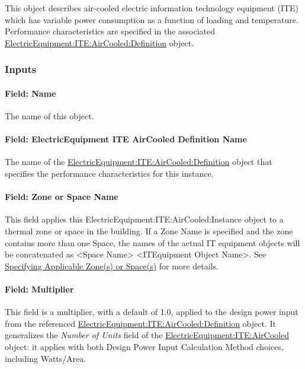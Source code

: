 This object describes air-cooled electric information technology equipment (ITE) which has variable power consumption as a function of loading and temperature. Performance characteristics are specified in the associated \hyperref[electricequipmentiteaircooleddefinition]{ElectricEquipment:ITE:AirCooled:Definition} object.

\subsubsection{Inputs}\label{inputs-9-009-ite-instance}

\paragraph{Field: Name}\label{field-name-9-008-ite-instance}

The name of this object.

\paragraph{Field: ElectricEquipment ITE AirCooled Definition Name}\label{field-electricequipment-ite-aircooled-definition-name}

The name of the \hyperref[electricequipmentiteaircooleddefinition]{ElectricEquipment:ITE:AirCooled:Definition} object that specifies the performance characteristics for this instance.

\paragraph{Field: Zone or Space Name}\label{iteq-field-zone-or-space-name-000-ite-instance}

This field applies this ElectricEquipment:ITE:AirCooled:Instance object to a thermal zone or space in the building. If a Zone Name is specified and the zone contains more than one Space, the names of the actual IT equipment objects will be concatenated as \textless{}Space Name\textgreater{} \textless{}ITEquipment Object Name\textgreater{}. See \hyperref[specifying-applicable-zones-or-spaces]{Specifying Applicable Zone(s) or Space(s)} for more details.

\paragraph{Field: Multiplier}\label{field-multiplier-iteinstance}

This field is a multiplier, with a default of 1.0, applied to the design power input from the referenced \hyperref[electricequipmentiteaircooleddefinition]{ElectricEquipment:ITE:AirCooled:Definition} object. It generalizes the \emph{Number of Units} field of the \hyperref[electricequipmentiteaircooled]{ElectricEquipment:ITE:AirCooled} object: it applies with both Design Power Input Calculation Method choices, including Watts/Area.

